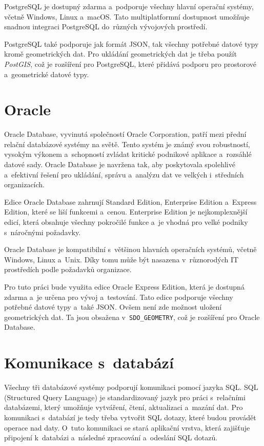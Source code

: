 PostgreSQL je dostupný zdarma a~podporuje všechny hlavní operační systémy, včetně Windows, Linux a~macOS. 
Tato multiplatformní dostupnost umožňuje snadnou integraci PostgreSQL do~různých vývojových prostředí.
\cite{postgresql}

PostgreSQL také podporuje jak formát JSON, tak všechny potřebné datové typy kromě geometrických dat.
Pro ukládání geometrických dat je třeba použít \textit{PostGIS}, což je rozšíření pro PostgreSQL, které přidává
podporu pro prostorové a~geometrické datové typy.

\section{Oracle}
Oracle Database, vyvinutá společností Oracle Corporation, patří mezi přední relační 
databázové systémy na světě. Tento systém je známý svou robustností, vysokým výkonem 
a~schopností zvládat kritické podnikové aplikace a~rozsáhlé datové sady. Oracle Database 
je navržena tak, aby poskytovala spolehlivé a~efektivní řešení pro ukládání, správu 
a~analýzu dat ve velkých i~středních organizacích.

Edice Oracle Database zahrnují Standard Edition, Enterprise Edition a~Express Edition,
které se liší funkcemi a~cenou. Enterprise Edition je nejkomplexnější edicí, která
obsahuje všechny pokročilé funkce a~je vhodná pro velké podniky s~náročnými požadavky.

Oracle Database je kompatibilní s~většinou hlavních operačních systémů, včetně Windows, 
Linux a~Unix. Díky tomu může být nasazena v~různorodých IT prostředích podle požadavků organizace.
\cite{oracle_database}

Pro tuto práci bude využita edice Oracle Express Edition, která je dostupná zdarma a~je určena pro vývoj a~testování.
Tato edice podporuje všechny potřebné datové typy a~také JSON. Ovšem není zde možnost 
uložení geometrických dat. Ta jsou obsažena v~\texttt{SDO\_GEOMETRY}, což je rozšíření pro Oracle Database.

\section{Komunikace s~databází}
Všechny tři databázové systémy podporují komunikaci pomocí jazyka SQL.
SQL (Structured Query Language) je standardizovaný jazyk pro práci s~relačními databázemi,
který umožňuje vytváření, čtení, aktualizaci a~mazání dat.
Pro komunikaci s~databází je tedy třeba vytvořit SQL dotazy, které budou provádět operace nad daty.
O~tuto komunikaci se stará aplikační vrstva, která zajišťuje připojení k~databázi a~následné zpracování a~odeslání SQL dotazů.